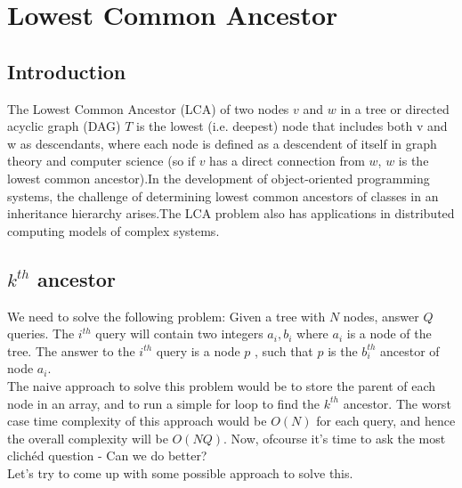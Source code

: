 \chapter{Lowest Common Ancestor}
\section{Introduction}
The Lowest Common Ancestor (LCA) of two nodes $v$ and $w$ in a tree or directed acyclic graph (DAG) $T$ is the lowest (i.e. deepest) node that includes both v and w as descendants, where each node is defined as a descendent of itself in graph theory and computer science (so if $v$ has a direct connection from $w$, $w$ is the lowest common ancestor).In the development of object-oriented programming systems, the challenge of determining lowest common ancestors of classes in an inheritance hierarchy arises.The LCA problem also has applications in distributed computing models of complex systems.

\section{$k^{th}$ ancestor}
We need to solve the following problem: Given a tree with $N$ nodes, answer $Q$ queries. The $i^{th}$ query will contain two integers $a_i,b_i$ where $a_i$ is a node of the tree. The answer to the $i^{th}$ query is a node $p$ , such that $p$ is the $b_i^{th}$ ancestor of node $a_i$.\\
The naive approach to solve this problem would be to store the parent of each node in an array, and to run a simple for loop to find the $k^{th}$ ancestor. The worst case time complexity of this approach would be $O(N)$ for each query, and hence the overall complexity will be $O(NQ)$. Now, ofcourse it's time to ask the most clichéd question - Can we do better?\\
Let's try to come up with some possible approach to solve this.\\
\clearpage
